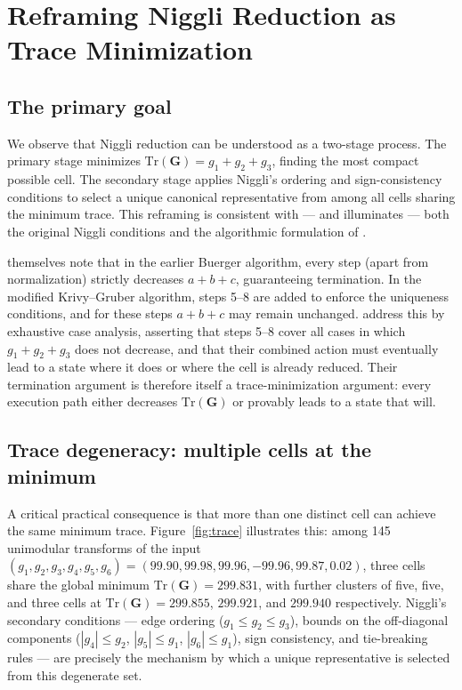 \documentclass[preprint]{iucr}              %
\numberwithin{equation}{section}
\begin{document}
	
	\section{Reframing Niggli Reduction as Trace Minimization}
	\label{sec:trace}
	
	\subsection{The primary goal}
	
	We observe that Niggli reduction can be understood as a two-stage
	process. The primary stage minimizes $\mathrm{Tr}(\mathbf{G}) =
	g_1 + g_2 + g_3$, finding the most compact possible cell. The
	secondary stage applies Niggli's ordering and sign-consistency
	conditions to select a unique canonical representative from among
	all cells sharing the minimum trace. This reframing is consistent
	with --- and illuminates --- both the original Niggli conditions and
	the algorithmic formulation of .
	
	 themselves note that in the earlier Buerger
	algorithm, every step (apart from normalization) strictly decreases
	$a + b + c$, guaranteeing termination. In the modified
	Krivy--Gruber algorithm, steps 5--8 are added to enforce the
	uniqueness conditions, and for these steps $a + b + c$ may remain
	unchanged.  address this by exhaustive case
	analysis, asserting that steps 5--8 cover all cases in which
	$g_1 + g_2 + g_3$ does not decrease, and that their combined
	action must eventually lead to a state where it does or where the
	cell is already reduced. Their termination argument is therefore
	itself a trace-minimization argument: every execution path either
	decreases $\mathrm{Tr}(\mathbf{G})$ or provably leads to a state
	that will.
	
	\subsection{Trace degeneracy: multiple cells at the minimum}
	
	A critical practical consequence is that more than one distinct cell
	can achieve the same minimum trace. Figure~\ref{fig:trace} illustrates
	this: among 145 unimodular transforms of the input
	$(g_1, g_2, g_3, g_4, g_5, g_6) = (99.90, 99.98, 99.96, -99.96,
	99.87, 0.02)$, three cells share the global minimum
	$\mathrm{Tr}(\mathbf{G}) = 299.831$, with further clusters of five,
	five, and three cells at $\mathrm{Tr}(\mathbf{G}) = 299.855$,
	$299.921$, and $299.940$ respectively. Niggli's secondary conditions
	--- edge ordering ($g_1 \leq g_2 \leq g_3$), bounds on the
	off-diagonal components ($|g_4| \leq g_2$, $|g_5| \leq g_1$,
	$|g_6| \leq g_1$), sign consistency, and tie-breaking rules ---
	are precisely the mechanism by which a unique representative is
	selected from this degenerate set.
	
\end{document}
